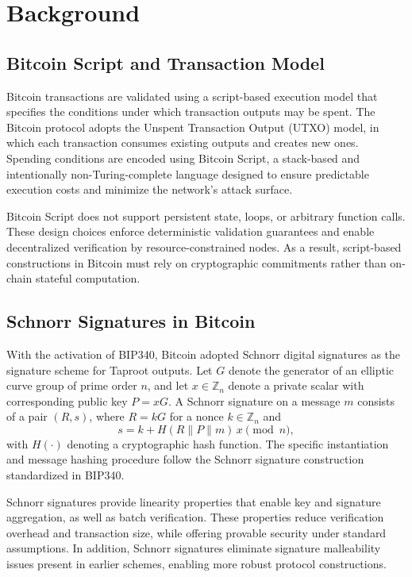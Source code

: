 \documentclass{ieeeaccess}
\begin{document}
\section{Background}
\label{sec.background}

\subsection{Bitcoin Script and Transaction Model}

Bitcoin transactions are validated using a script-based execution model that specifies the conditions under which transaction outputs may be spent.
The Bitcoin protocol adopts the Unspent Transaction Output (UTXO) model, in which each transaction consumes existing outputs and creates new ones.
Spending conditions are encoded using Bitcoin Script, a stack-based and intentionally non-Turing-complete language designed to ensure predictable execution costs and minimize the network’s attack surface.

Bitcoin Script does not support persistent state, loops, or arbitrary function calls.
These design choices enforce deterministic validation guarantees and enable decentralized verification by resource-constrained nodes.
As a result, script-based constructions in Bitcoin must rely on cryptographic commitments rather than on-chain stateful computation.

\subsection{Schnorr Signatures in Bitcoin}

With the activation of BIP340, Bitcoin adopted Schnorr digital signatures as the signature scheme for Taproot outputs.
Let $G$ denote the generator of an elliptic curve group of prime order $n$, and let $x \in \mathbb{Z}_n$ denote a private scalar with corresponding public key $P = xG$.
A Schnorr signature on a message $m$ consists of a pair $(R, s)$, where $R = kG$ for a nonce $k \in \mathbb{Z}_n$ and
\[
s = k + H(R \parallel P \parallel m)\,x \pmod{n},
\]
with $H(\cdot)$ denoting a cryptographic hash function.
The specific instantiation and message hashing procedure follow the Schnorr signature construction standardized in BIP340.

Schnorr signatures provide linearity properties that enable key and signature aggregation, as well as batch verification.
These properties reduce verification overhead and transaction size, while offering provable security under standard assumptions.
In addition, Schnorr signatures eliminate signature malleability issues present in earlier schemes, enabling more robust protocol constructions.
\end{document}
